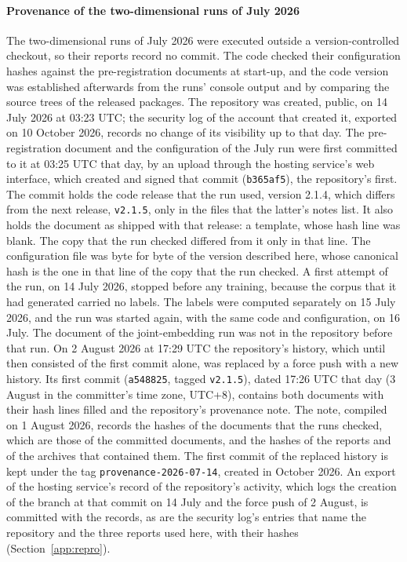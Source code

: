 \paragraph{Provenance of the two-dimensional runs of July 2026}
The two-dimensional runs of July 2026 were executed outside a version-controlled checkout,
so
their reports record no commit. The code checked their configuration hashes against the
pre-registration documents at start-up, and the code version was established afterwards
from the runs' console output and by comparing the source trees of the released packages.
The repository was created, public, on 14 July 2026 at 03:23 UTC; the security log of the
account that created it, exported on 10 October 2026, records no change of its visibility
up to that day. The pre-registration document and the configuration of the July run were
first committed to it at 03:25 UTC
that day, by an upload through the hosting service's web interface, which created and
signed that commit (\texttt{b365af5}), the repository's first. The commit holds the code
release that the run used, version 2.1.4, which differs from the next release,
\texttt{v2.1.5}, only in the files that the latter's notes list. It also holds the document as shipped with
that release: a template, whose hash line was blank. The copy that the run
checked differed from it only in that line. The configuration file was byte for byte
 of the version described here, whose canonical hash is
the one in that line of the copy that the run checked. A first attempt of the run, on 14
July 2026, stopped before any training, because the corpus that it had generated carried no labels. The labels were computed
separately on 15 July 2026, and the run was started again,
with the same code and configuration, on 16 July. The document of the joint-embedding run
was not in the repository before that run. On 2 August 2026 at 17:29 UTC the repository's
history, which until then consisted of the first commit alone, was replaced by a force push with a new history. Its first commit (\texttt{a548825}, tagged
\texttt{v2.1.5}),
dated 17:26 UTC that day (3 August in the committer's time zone, UTC+8), contains both
documents with their hash lines filled and the repository's provenance note. The note,
compiled on 1 August 2026, records the hashes of the documents that the runs checked, which
are those of the committed documents, and the hashes of the reports and of the archives
that contained them. The first commit of the replaced history is kept under the tag
\texttt{provenance-2026-07-14}, created in October 2026. An export of the hosting service's
record of the repository's activity, which logs the creation of the branch at that commit
on 14 July and the force push of 2 August, is committed with the records, as are the security log's
entries that name the repository and the three reports used here, with their hashes
(Section~\ref{app:repro}).

